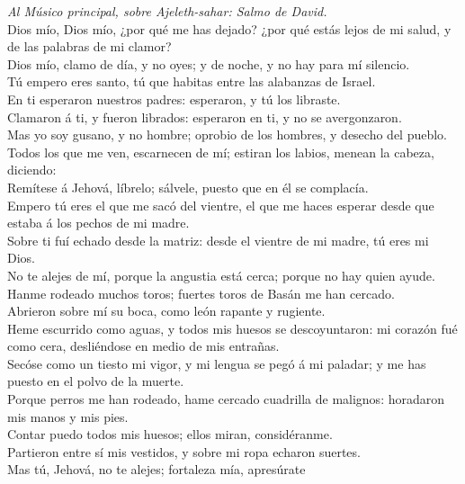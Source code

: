  \emph{Al Músico principal, sobre Ajeleth-sahar: Salmo de
David.}\\
Dios mío, Dios mío, ¿por qué me has dejado? ¿por qué estás lejos de mi
salud, y de las palabras de mi clamor?\\
 Dios mío, clamo de día, y no oyes; y de noche, y no hay
para mí silencio.\\
 Tú empero eres santo, tú que habitas entre las alabanzas de
Israel.\\
 En ti esperaron nuestros padres: esperaron, y tú los
libraste.\\
 Clamaron á ti, y fueron librados: esperaron en ti, y no se
avergonzaron.\\
 Mas yo soy gusano, y no hombre; oprobio de los hombres, y
desecho del pueblo.\\
 Todos los que me ven, escarnecen de mí; estiran los labios,
menean la cabeza, diciendo:\\
 Remítese á Jehová, líbrelo; sálvele, puesto que en él se
complacía.\\
 Empero tú eres el que me sacó del vientre, el que me haces
esperar desde que estaba á los pechos de mi madre.\\
 Sobre ti fuí echado desde la matriz: desde el vientre de
mi madre, tú eres mi Dios.\\
 No te alejes de mí, porque la angustia está cerca; porque
no hay quien ayude.\\
 Hanme rodeado muchos toros; fuertes toros de Basán me han
cercado.\\
 Abrieron sobre mí su boca, como león rapante y rugiente.\\
 Heme escurrido como aguas, y todos mis huesos se
descoyuntaron: mi corazón fué como cera, desliéndose en medio de mis
entrañas.\\
 Secóse como un tiesto mi vigor, y mi lengua se pegó á mi
paladar; y me has puesto en el polvo de la muerte.\\
 Porque perros me han rodeado, hame cercado cuadrilla de
malignos: horadaron mis manos y mis pies.\\
 Contar puedo todos mis huesos; ellos miran,
considéranme.\\
 Partieron entre sí mis vestidos, y sobre mi ropa echaron
suertes.\\
 Mas tú, Jehová, no te alejes; fortaleza mía, apresúrate
